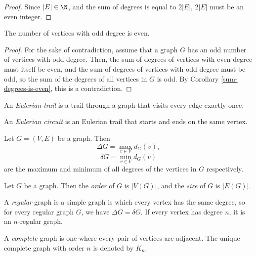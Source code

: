 \documentclass[12pt]{article}
\begin{document}
\begin{proof}
    Since $|E| \in \N$, and the sum of degrees is equal to $2|E|$, $2|E|$ must be an even integer.
\end{proof}

\begin{cor}\label{n-of-odd-vertices-is-even}
    The number of vertices with odd degree is even.
\end{cor}

\begin{proof}
    For the sake of contradiction, assume that a graph $G$ has an odd number of vertices with odd degree. Then, the sum of degrees of vertices with even degree must itself be even, and the sum of degrees of vertices with odd degree must be odd, so the sum of the degrees of all vertices in $G$ is odd. By Corollary \ref{sum-degrees-is-even}, this is a contradiction.
\end{proof}

\begin{defn}
    An \emph{Eulerian trail} is a trail through a graph that visits every edge exactly once.
\end{defn}

\begin{defn}
    An \emph{Eulerian circuit} is an Eulerian trail that starts and ends on the same vertex.
\end{defn}

\begin{defn}
    Let $G = (V, E)$ be a graph. Then
    \[\Delta G = \max_{v \in V}d_G(v),\]
    \[\delta G = \min_{v \in V}d_G(v)\] are the maximum and minimum of all degrees of the vertices in $G$ respectively.
\end{defn}

\begin{defn}
    Let $G$ be a graph. Then the \emph{order} of $G$ is $|V(G)|$, and the \emph{size} of $G$ is $|E(G)|$.
\end{defn}

\begin{defn}
    A \emph{regular} graph is a simple graph is which every vertex has the same degree, so for every regular graph $G$, we have $\Delta G = \delta G$. If every vertex has degree $n$, it is an $n$-regular graph.
\end{defn}

\begin{defn}
    A \emph{complete} graph is one where every pair of vertices are adjacent. The unique complete graph with order $n$ is denoted by $K_n$.
\end{defn}
\end{document}
